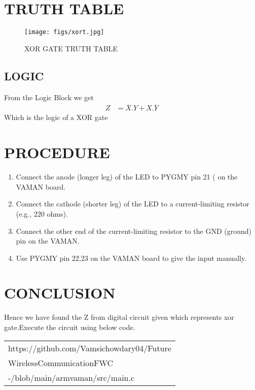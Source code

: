 \documentclass[journal,12pt,twocolumn]{IEEEtran}
\begin{document}
\section{TRUTH TABLE}
\begin{figure}[H]
\centering
\texttt{[image: figs/xort.jpg]}
\caption{XOR GATE TRUTH TABLE}
\label{fig:xort.png}
\end{figure}

\subsection{LOGIC}
From the Logic Block  we get
\begin{align}
  Z&=\overline{X}.Y+X.\overline{Y}
\end{align}
Which is the logic of a XOR gate 

\section{PROCEDURE}
\begin{enumerate}
\item Connect the anode (longer leg) of the LED to PYGMY pin 21 ( on the VAMAN board.
\item Connect the cathode (shorter leg) of the LED to a current-limiting resistor (e.g., 220 ohms).
\item Connect the other end of the current-limiting resistor to the GND (ground) pin on the VAMAN.
\item Use PYGMY pin 22,23 on the VAMAN board to give the input manually.
\end{enumerate}

\section{CONCLUSION}
Hence we have found the Z from  digital circuit given which represents xor gate.Execute the circuit using below code.

   \begin{tabularx}{0.46\textwidth} { 
  | >{\centering\arraybackslash}X |}
  \hline
https://github.com/Vamsichowdary04/Future\\\-Wireless\-Communication\-FWC\\-/blob/main/armvaman/src/main.c\\
  \hline
\end{tabularx}


\end{document}
